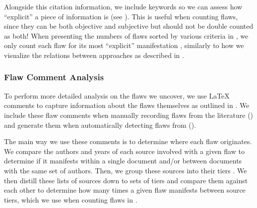 \label{auto-flaw-detect-explicitness}
Alongside this citation information, we include keywords so we can assess how
``explicit'' a piece of information is (see ). This is
useful when counting flaws, since they can be both objective and subjective but
should not be double counted as both! When presenting
the numbers of flaws sorted by various criteria in ,
we only count each flaw for its most ``explicit'' manifestation%
, similarly to how we visualize the relations
between approaches as described in .

\subsubsection{Flaw Comment Analysis}\label{flaw-comment-analysis}

To perform more detailed analysis on the flaws we uncover, we use \LaTeX{}
comments to capture information about the flaws themselves as outlined in
. We include these flaw comments when manually
recording flaws from the literature () and generate them when
automatically detecting flaws from \ourApproachGlossary{}
().

The main way we use these comments is to determine where each flaw originates.
We compare the authors and years of each source involved with a given flaw
to determine if it manifests within a single document and/or between documents
with the same set of authors. Then, we group these sources into their tiers
.
We then distill these lists of sources down to sets of tiers and compare them
against each other to determine how many times a given flaw manifests between
source tiers, which we use when counting flaws in .


